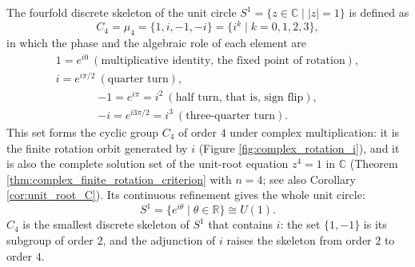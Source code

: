 \begin{definition}\label{def:unit_circle_fourfold_skeleton}
The fourfold discrete skeleton of the unit circle $S^1=\{z\in\mathbb{C}\mid |z|=1\}$ is defined as
\[
C_4=\mu_4=\{1,i,-1,-i\}=\{i^k\mid k=0,1,2,3\},
\]
in which the phase and the algebraic role of each element are
\[
\begin{gathered}1=e^{i0}\ (\text{multiplicative identity, the fixed point of rotation}),\\
i=e^{i\pi/2}\ (\text{quarter turn}),\end{gathered}
\]
\[
\begin{gathered}-1=e^{i\pi}=i^2\ (\text{half turn, that is, sign flip}),\\
-i=e^{i3\pi/2}=i^3\ (\text{three-quarter turn}).\end{gathered}
\]
This set forms the cyclic group $C_4$ of order $4$ under complex multiplication: it is the finite rotation orbit generated by $i$ (Figure \ref{fig:complex_rotation_i}), and it is also the complete solution set of the unit-root equation $z^4=1$ in $\mathbb{C}$ (Theorem \ref{thm:complex_finite_rotation_criterion} with $n=4$; see also Corollary \ref{cor:unit_root_C}). Its continuous refinement gives the whole unit circle:
\[
S^1=\{e^{i\theta}\mid\theta\in\mathbb{R}\}\cong U(1).
\]
$C_4$ is the smallest discrete skeleton of $S^1$ that contains $i$: the set $\{1,-1\}$ is its subgroup of order $2$, and the adjunction of $i$ raises the skeleton from order $2$ to order $4$.
\end{definition}

